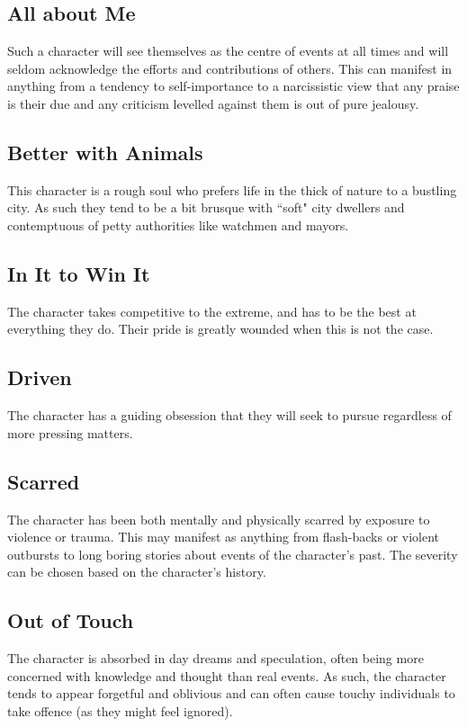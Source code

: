 \documentclass[a4paper,10pt,oneside]{book}
\begin{document}
\subsection{All about Me}
Such a character will see themselves as the centre of events at all times and will seldom acknowledge the efforts and contributions of others. This can manifest in anything from a tendency to self-importance to a narcissistic view that any praise is their due and any criticism levelled against them is out of pure jealousy. 

\subsection{Better with Animals}
This character is a rough soul who prefers life in the thick of nature to a bustling city. As such they tend to be a bit brusque with ``soft" city dwellers and contemptuous of petty authorities like watchmen and mayors.

\subsection{In It to Win It}
The character takes competitive to the extreme, and has to be the best at everything they do. Their pride is greatly wounded when this is not the case. 

\subsection{Driven}
The character has a guiding obsession that they will seek to pursue regardless of more pressing matters.

\subsection{Scarred}
The character has been both mentally and physically scarred by exposure to violence or trauma. This may manifest as anything from flash-backs or violent outbursts to long boring stories about events of the character's past. The severity can be chosen based on the character's history.

\subsection{Out of Touch}
The character is absorbed in day dreams and speculation, often being more concerned with knowledge and thought than real events. As such, the character tends to appear forgetful and oblivious and can often cause touchy individuals to take offence (as they might feel ignored).
\end{document}
